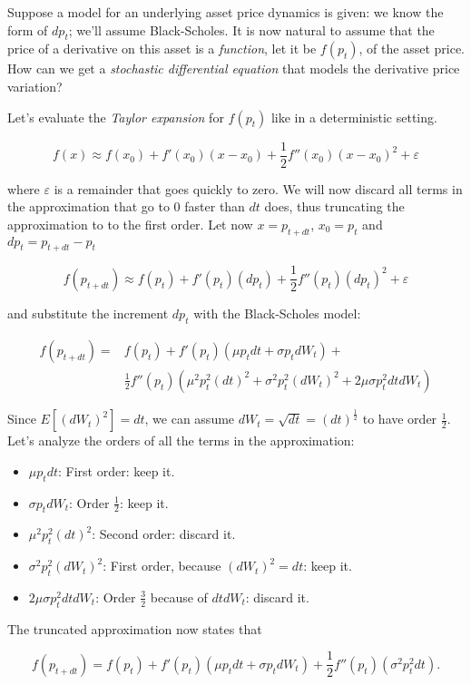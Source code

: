 \documentclass[oneside,titlepage,headinclude,12pt,a4paper,BCOR5mm,footinclude]{book}
\theoremstyle{defn}
\begin{document}
  Suppose a model for  an underlying asset price dynamics is  given: we know the
  form of $dp_t$;  we'll assume Black-Scholes. It is now  natural to assume that
  the price  of a  derivative on this  asset is a  \textit{function}, let  it be
  $f(p_t)$, of the asset price. How can we get a \textit{stochastic differential
  equation} that models the derivative price variation?

  Let's evaluate the \textit{Taylor expansion} for $f(p_t)$ like in a deterministic setting.
  
  \[
    f(x) \approx f(x_0) + f'(x_0)(x-x_0) + \frac{1}{2} f''(x_0)(x-x_0)^2 + \varepsilon
  \]

  where $\varepsilon$  is a  remainder that  goes quickly to  zero. We  will now
  discard all  terms in the  approximation that go to  0 faster than  $dt$ does,
  thus truncating the approximation to to the first order. Let now $x=p_{t+dt}$,
  $x_0 = p_t$ and $dp_t = p_{t+dt} - p_t$
  
  \[
    f(p_{t+dt}) \approx f(p_t) + f'(p_t)(dp_t) + \frac{1}{2} f''(p_t)(dp_t)^2 + \varepsilon
  \]
  
  and substitute the increment $dp_t$ with the Black-Scholes model:

  \begin{align*}
    f(p_{t+dt}) = & f(p_t) + f'(p_t)(\mu p_t dt + \sigma p_t dW_t) +\\ 
                  & \frac{1}{2}f''(p_t)(\mu^2 p_t^2 (dt)^2 + \sigma^2 p_t^2 (dW_t)^2 + 2 \mu \sigma p_t^2 dtdW_t) 
  \end{align*}

  Since $E[(dW_t)^2] = dt$, we can  assume $dW_t = \sqrt{dt} = (dt)^\frac{1}{2}$
  to have order $\frac{1}{2}$. Let's analyze the  orders of all the terms in the
  approximation:
  \begin{itemize}
    \item $\mu p_t dt$: First order: keep it.
    \item $\sigma p_t dW_t$: Order $\frac{1}{2}$: keep it.
    \item $\mu^2 p_t^2 (dt)^2$: Second order: discard it.
    \item $\sigma^2 p_t^2 (dW_t)^2$: First order, because $(dW_t)^2 = dt$: keep it.
    \item $2 \mu \sigma p_t^2 dtdW_t$: Order $\frac{3}{2}$ because of $dtdW_t$: discard it.
  \end{itemize}
  The truncated approximation now states that

  \[
    f(p_{t+dt}) = f(p_t) + f'(p_t)(\mu p_t dt + \sigma p_t dW_t) + 
    \frac{1}{2} f''(p_t)(\sigma^2 p_t^2 dt). 
  \]
\end{document}
